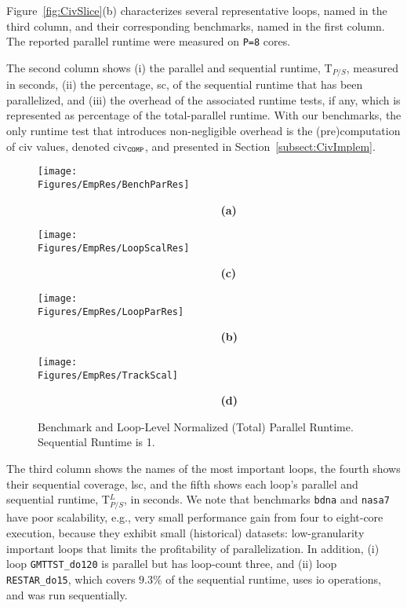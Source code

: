 \documentclass[10pt,nocopyrightspace]{sigplanconf}
\newcommand{\Figures}[1]{../Figures/}
\begin{document}
%
Figure~\ref{fig:CivSlice}(b) characterizes several representative loops, named in 
the third column, and their corresponding benchmarks, named in the first column.
The reported parallel runtime were measured on {\tt P=8} cores.


The second column shows 
(i)   the parallel and sequential runtime, T$_{P/S}$, measured in seconds,
(ii)  the percentage, {\sc sc}, of the sequential runtime that has been parallelized, and 
(iii) the overhead of the associated runtime tests, if any, which is represented as percentage of
        the total-parallel runtime. With our benchmarks, the only runtime test that introduces
        non-negligible overhead is the (pre)computation of {\sc civ} values, 
        denoted {\sc civ}$_{\tt{}COMP}$, and presented in Section~\ref{subsect:CivImplem}.   


\begin{figure*}[t] 
\begin{minipage}{1.2\columnwidth}
    \texttt{[image: \\Figures/EmpRes/BenchParRes]} 

      {\bf~~~~~~~~~~~~~~~~~~~~~~~~~~~~~(a)} \vspace{2ex}

    \texttt{[image: \\Figures/EmpRes/LoopScalRes]}
      
      {\bf~~~~~~~~~~~~~~~~~~~~~~~~~~~~~(c)}\vspace{1ex}

\end{minipage}
\begin{minipage}{0.9\columnwidth}
    \texttt{[image: \\Figures/EmpRes/LoopParRes]} 

      {\bf~~~~~~~~~~~~~~~~~~~~~~~~~~~~~(b)}\vspace{2ex}

   \texttt{[image: \\Figures/EmpRes/TrackScal]}
      
      {\bf~~~~~~~~~~~~~~~~~~~~~~~~~~~~~(d)}\vspace{1ex}

\end{minipage}
\caption{ Benchmark and Loop-Level Normalized (Total) Parallel Runtime. Sequential Runtime is 1.}
\label{fig:ParRuntime} %
\end{figure*}


The third column shows the names of the most important loops,
the fourth shows their sequential coverage, {\sc lsc}, and the
fifth shows each loop's parallel and sequential runtime, T$_{P/S}^L$, in seconds.
%
We note that benchmarks {\tt bdna} and {\tt nasa7} have poor scalability, e.g., very small
performance gain from four to eight-core execution, because they exhibit
small (historical) datasets: low-granularity important loops that limits the 
profitability of parallelization.
In addition, (i) loop {\tt GMTTST\_do120} 
is parallel but has loop-count three, and (ii) loop {\tt RESTAR\_do15},
which covers $9.3\%$ of the sequential runtime, uses {\sc io} operations,
and was run sequentially. 
\end{document}
